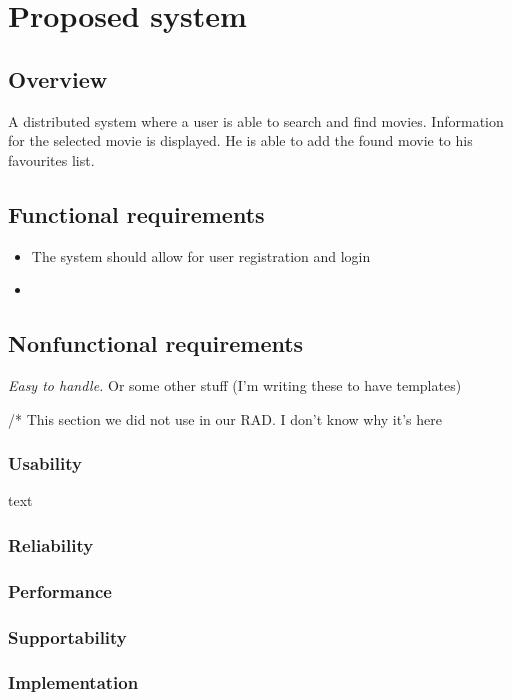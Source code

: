 \chapter{Proposed system}
\label{sec:proposed system}

\section{Overview}
A distributed system where a user is able to search and find movies. Information for the selected movie is displayed. He is able to add the found movie to his favourites list.

\section{Functional requirements}
\begin{itemize}
	\setlength{\itemsep}{-5pt}
	\item The system should allow for user registration and login
	\item 
\end{itemize}

\section{Nonfunctional requirements}

\emph{Easy to handle.} Or some other stuff (I'm writing these to have templates)

/* This section we did not use in our RAD. I don't know why it's here
\subsection{Usability}
text

\subsection{Reliability}

\subsection{Performance}

\subsection{Supportability}

\subsection{Implementation}

